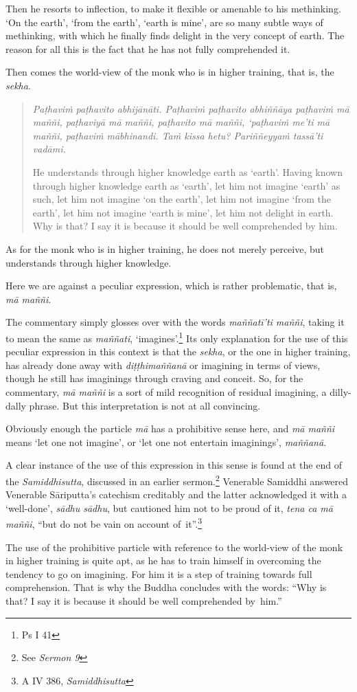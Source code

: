 Then he resorts to inflection, to make it flexible or amenable to his methinking. `On the earth', `from the earth', `earth is mine', are so many subtle ways of methinking, with which he finally finds delight in the very concept of earth. The reason for all this is the fact that he has not fully comprehended it.

Then comes the world-view of the monk who is in higher training, that is, the \emph{sekha}.

\begin{quote}
\emph{Paṭhaviṁ paṭhavito abhijānāti. Paṭhaviṁ paṭhavito abhiññāya paṭhaviṁ mā maññi, paṭhaviyā mā maññi, paṭhavito mā maññi, `paṭhaviṁ me'ti mā maññi, paṭhaviṁ mābhinandi. Taṁ kissa hetu? Pariññeyyaṁ tassā'ti vadāmi.}

He understands through higher knowledge earth as `earth'. Having known through higher knowledge earth as `earth', let him not imagine `earth' as such, let him not imagine `on the earth', let him not imagine `from the earth', let him not imagine `earth is mine', let him not delight in earth. Why is that? I say it is because it should be well comprehended by him.
\end{quote}

As for the monk who is in higher training, he does not merely perceive, but understands through higher knowledge.

Here we are against a peculiar expression, which is rather problematic, that is, \emph{mā maññi}.

The commentary simply glosses over with the words \emph{maññatī'ti maññi}, taking it to mean the same as \emph{maññati}, `imagines'.\footnote{Ps I 41} Its only explanation for the use of this peculiar expression in this context is that the \emph{sekha}, or the one in higher training, has already done away with \emph{diṭṭhimaññanā} or imagining in terms of views, though he still has imaginings through craving and conceit. So, for the commentary, \emph{mā maññi} is a sort of mild recognition of residual imagining, a dilly-dally phrase. But this interpretation is not at all convincing.

Obviously enough the particle \emph{mā} has a prohibitive sense here, and \emph{mā maññi} means `let one not imagine', or `let one not entertain imaginings', \emph{maññanā}.

A clear instance of the use of this expression in this sense is found at the end of the \emph{Samiddhisutta}, discussed in an earlier sermon.\footnote{See \emph{Sermon 9}} Venerable Samiddhi answered Venerable Sāriputta's catechism creditably and the latter acknowledged it with a `well-done', \emph{sādhu sādhu}, but cautioned him not to be proud of it, \emph{tena ca mā maññi}, ``but do not be vain on account of~it''.\footnote{A IV 386, \emph{Samiddhisutta}}

The use of the prohibitive particle with reference to the world-view of the monk in higher training is quite apt, as he has to train himself in overcoming the tendency to go on imagining. For him it is a step of training towards full comprehension. That is why the Buddha concludes with the words: ``Why is that? I say it is because it should be well comprehended by~him.''
